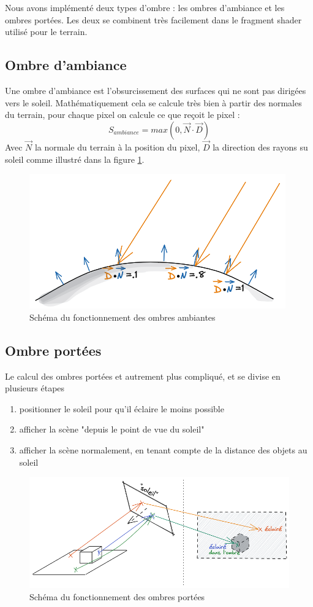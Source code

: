 \documentclass{EPUProjetDi}
\begin{document}
Nous avons implémenté deux types d'ombre : les ombres d'ambiance et les ombres portées. Les deux se combinent très facilement dans le fragment shader utilisé pour le terrain.
\subsection{Ombre d'ambiance}
Une ombre d'ambiance est l'obsurcissement des surfaces qui ne sont pas dirigées vers le soleil. Mathématiquement cela se calcule très bien à partir des normales du terrain, pour chaque pixel on calcule ce que reçoit le pixel :
$$ S_{ambiance}=max(0, \vec{N}\cdot \vec{D}) $$
Avec $\vec{N}$ la normale du terrain à la position du pixel, $\vec{D}$ la direction des rayons su soleil comme illustré dans la figure \ref{fig:ambiant_shadows_schema}.

\begin{figure}[ht]
	\centering
	\includegraphics[scale=.49]{ombres_ambiantes}
	\caption{Schéma du fonctionnement des ombres ambiantes}
	\label{fig:ambiant_shadows_schema}
\end{figure}

\subsection{Ombre portées}
\label{sec:casted_shadows}
Le calcul des ombres portées et autrement plus compliqué, et se divise en plusieurs étapes
\begin{enumerate}
\itemsep-.5em
\item positionner le soleil pour qu'il éclaire le moins possible
\item afficher la scène "depuis le point de vue du soleil"
\item afficher la scène normalement, en tenant compte de la distance des objets au soleil
\end{enumerate}

\begin{figure}[ht]
	\centering
	\includegraphics[scale=.49]{ombres}
	\caption{Schéma du fonctionnement des ombres portées}
	\label{fig:shadows_schema}
\end{figure}
\end{document}
